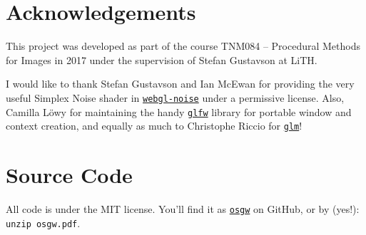 \documentclass[a4paper, twocolumn]{article}
\begin{document}
    \newpage

    \section*{Acknowledgements}

    This project was developed as part of the course TNM084 -- Procedural Methods for Images in 2017 under the supervision of Stefan Gustavson at LiTH.

    I would like to thank Stefan Gustavson and Ian McEwan for providing the very useful Simplex Noise shader in \href{https://github.com/stegu/webgl-noise}{\texttt{webgl-noise}} under a permissive license. Also, Camilla Löwy for maintaining the handy \href{https://github.com/glfw/glfw}{\texttt{glfw}} library for portable window and context creation, and equally as much to Christophe Riccio for \href{https://github.com/g-truc/glm}{\texttt{glm}}!

    \section*{Source Code}

    All code is under the MIT license. You'll find it as \href{https://github.com/caffeineviking/osgw}{\texttt{osgw}} on GitHub, or by (yes!): \texttt{unzip osgw.pdf}.

    \nocite{*} %
    
    

    \appendix
    \clearpage \onecolumn
    
\end{document}
